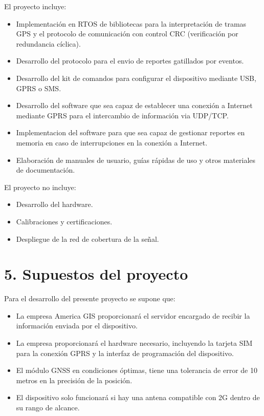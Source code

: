 \documentclass[
11pt, %
codirector, %
]{charter}
\begin{document}
El proyecto incluye:
\begin{itemize}

    \item Implementación en RTOS de bibliotecas para la interpretación de tramas GPS y el protocolo de comunicación con control CRC (verificación por redundancia cíclica).
    \item Desarrollo del protocolo para el envio de reportes gatillados por eventos.
    \item Desarrollo del kit de comandos para configurar el dispositivo mediante USB, GPRS o SMS.
    \item Desarrollo del software que sea capaz de establecer una conexión a Internet mediante GPRS para el intercambio de información via UDP/TCP.
    \item Implementacion del software para que sea capaz de gestionar reportes en memoria en caso de interrupciones en la conexión a Internet.
    \item Elaboración de manuales de usuario, guías rápidas de uso y otros materiales de documentación.

\end{itemize}
El proyecto no incluye:
\begin{itemize}
    \item Desarrollo del hardware.
    \item Calibraciones y certificaciones.
    \item Despliegue de la red de cobertura de la señal.
\end{itemize}
\pagebreak

\section{5. Supuestos del proyecto}
\label{sec:supuestos}
Para el desarrollo del presente proyecto se supone que:
\begin{itemize}
\item La empresa America GIS proporcionará el servidor encargado de recibir la información enviada por el dispositivo.
\item La empresa proporcionará el hardware necesario, incluyendo la tarjeta SIM para la conexión GPRS y la interfaz de programación del dispositivo.
\item El módulo GNSS en condiciones óptimas, tiene una tolerancia de error de 10 metros en la precisión de la posición.
\item El dispositivo solo funcionará si hay una antena compatible con 2G dentro de su rango de alcance.
\end{itemize}
\end{document}
